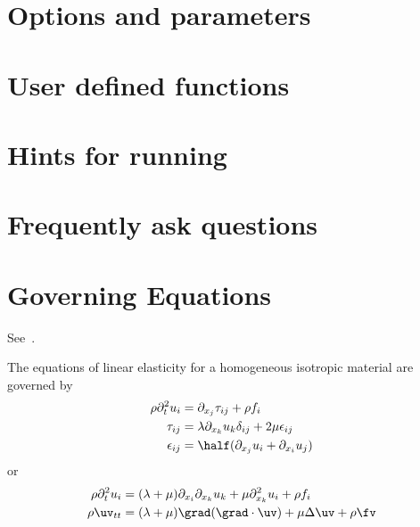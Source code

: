 \documentclass{article}
\begin{document}
\section{Options and parameters} \label{sec:options}


\section{User defined functions} \label{sec:userDefined}




\section{Hints for running} \label{sec:hints}


\section{Frequently ask questions} \label{sec:FAQ}



\section{Governing Equations}
See~\cite{smog2012}.

The equations of linear elasticity for a homogeneous isotropic material are governed by
\begin{align}
  \rho \partial_t^2 u_i &= \partial_{x_j} \tau_{ij} + \rho f_i \\
  \tau_{ij} &= \lambda \partial_{x_k} u_k \delta_{ij} + 2 \mu \epsilon_{ij} \\
  \epsilon_{ij} &= \half( \partial_{x_j} u_i + \partial_{x_i} u_j )
\end{align}
or
\begin{align}
  \rho \partial_t^2 u_i &= (\lambda+\mu) \partial_{x_i} \partial_{x_k} u_k + \mu \partial_{x_k}^2 u_i  +\rho f_i \\
  \rho \uv_{tt} &= (\lambda+\mu) \grad(\grad\cdot\uv) + \mu \Delta \uv + \rho \fv 
\end{align}
\end{document}
